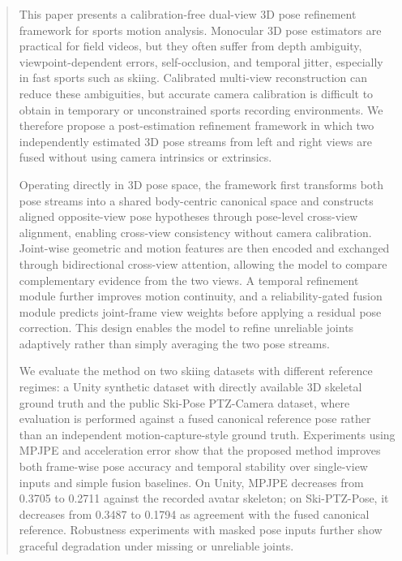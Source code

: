 \documentclass[sigconf,screen]{acmart}
\begin{document}
\begin{abstract}
This paper presents a calibration-free dual-view 3D pose refinement framework for sports motion analysis. Monocular 3D pose estimators are practical for field videos, but they often suffer from depth ambiguity, viewpoint-dependent errors, self-occlusion, and temporal jitter, especially in fast sports such as skiing. Calibrated multi-view reconstruction can reduce these ambiguities, but accurate camera calibration is difficult to obtain in temporary or unconstrained sports recording environments. We therefore propose a post-estimation refinement framework in which two independently estimated 3D pose streams from left and right views are fused without using camera intrinsics or extrinsics.

Operating directly in 3D pose space, the framework first transforms both pose streams into a shared body-centric canonical space and constructs aligned opposite-view pose hypotheses through pose-level cross-view alignment, enabling cross-view consistency without camera calibration. Joint-wise geometric and motion features are then encoded and exchanged through bidirectional cross-view attention, allowing the model to compare complementary evidence from the two views. A temporal refinement module further improves motion continuity, and a reliability-gated fusion module predicts joint-frame view weights before applying a residual pose correction. This design enables the model to refine unreliable joints adaptively rather than simply averaging the two pose streams.

We evaluate the method on two skiing datasets with different reference regimes: a Unity synthetic dataset with directly available 3D skeletal ground truth and the public Ski-Pose PTZ-Camera dataset, where evaluation is performed against a fused canonical reference pose rather than an independent motion-capture-style ground truth. Experiments using MPJPE and acceleration error show that the proposed method improves both frame-wise pose accuracy and temporal stability over single-view inputs and simple fusion baselines. On Unity, MPJPE decreases from 0.3705 to 0.2711 against the recorded avatar skeleton; on Ski-PTZ-Pose, it decreases from 0.3487 to 0.1794 as agreement with the fused canonical reference. Robustness experiments with masked pose inputs further show graceful degradation under missing or unreliable joints.
\end{abstract}
\end{document}
